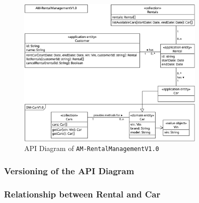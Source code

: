 \begin{figure}
    \centering
    \includegraphics[width=0.8\textwidth]{figures/microservices/rentalManagement/ms_rentalManagement_apiDiagram.png}
    \caption{API Diagram of \texttt{AM-RentalManagementV1.0}}
    \label{fig:ad_am-rental_management_v1.0}
\end{figure}

\subsubsection*{Versioning of the API Diagram}

\subsubsection*{Relationship between Rental and Car}
